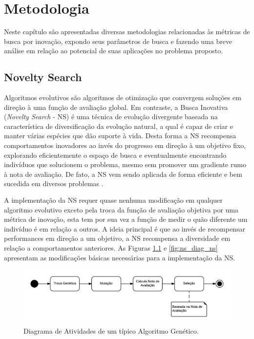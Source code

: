 \chapter{Metodologia}
\label{Metodologia}

Neste capítulo são apresentadas diversas metodologias relacionadas às métricas de busca por inovação, expondo seus parâmetros de busca e fazendo uma breve análise em relação ao potencial de suas aplicações no problema proposto.

\section{Novelty Search}

Algoritmos evolutivos são algoritmos de otimização que convergem soluções em direção à uma função de avaliação global. Em contraste, a Busca Inovativa (\emph{Novelty Search} - NS) \cite{lehman2008exploiting}  \cite{lehman2011abandoning} é uma técnica de evolução divergente baseada na característica de diversificação da evolução natural, a qual é capaz de criar e manter várias espécies que dão suporte à vida. Desta forma a NS recompensa comportamentos inovadores ao invés do progresso em direção à um objetivo fixo, explorando eficientemente o espaço de busca e eventualmente encontrando indivíduos que solucionem o problema, mesmo sem promover um gradiente rumo à nota de avaliação. De fato, a NS vem sendo aplicada de forma eficiente e bem sucedida em diversos problemas \cite{lehman2011evolving} \cite{liapis2013sentient} \cite{woolley2014novel}.

A implementação da NS requer quase nenhuma modificação em qualquer algoritmo evolutivo exceto pela troca da função de avaliação objetiva por uma métrica de inovação, esta tem por sua vez a função de medir o quão diferente um indivíduo é em relação a outros. A ideia principal é que ao invés de recompensar performances em direção a um objetivo, a NS recompensa a diversidade em relação a comportamentos anteriores. As Figuras \ref{fig:ns_diag_ag} e \ref{fig:ns_diag_ns} apresentam as modificações básicas necessárias para a implementação da NS.

\begin{figure}[htb]
	\begin{center}
		\includegraphics[width=1.0\textwidth]{Imagens/ns_diag_ag.png}
		\caption{Diagrama de Atividades de um típico Algoritmo Genético.}
		\label{fig:ns_diag_ag}
	\end{center}
\end{figure}
 
